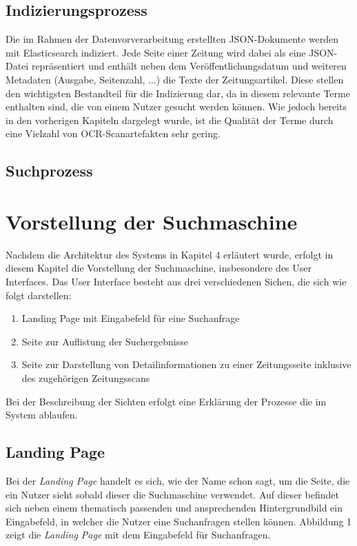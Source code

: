 \documentclass[11pt,a4paper, halfparskip]{scrartcl}
\begin{document}
\subsection{Indizierungsprozess}

Die im Rahmen der Datenvorverarbeitung erstellten JSON-Dokumente werden mit Elasticsearch indiziert. 
Jede Seite einer Zeitung wird dabei als eine JSON-Datei repräsentiert und enthält neben dem Veröffentlichungsdatum und weiteren Metadaten (Ausgabe, Seitenzahl, ...) die Texte der Zeitungsartikel.
Diese stellen den wichtigsten Bestandteil für die Indizierung dar, da in diesem relevante Terme enthalten sind, die von einem Nutzer gesucht werden können.
Wie jedoch bereits in den vorherigen Kapiteln dargelegt wurde, ist die Qualität der Terme durch eine Vielzahl von OCR-Scanartefakten sehr gering.

\subsection{Suchprozess}

\section{Vorstellung der Suchmaschine}

Nachdem die Architektur des Systems in Kapitel 4 erläutert wurde, erfolgt in diesem Kapitel die Vorstellung der Suchmaschine, insbesondere des User Interfaces.
Das User Interface besteht aus drei verschiedenen Sichen, die sich wie folgt darstellen:
	\begin{enumerate}
		\item Landing Page mit Eingabefeld für eine Suchanfrage
		\item Seite zur Auflistung der Suchergebnisse
		\item Seite zur Darstellung von Detailinformationen zu einer Zeitungsseite inklusive des zugehörigen Zeitungsscans  	
	\end{enumerate}
Bei der Beschreibung der Sichten erfolgt eine Erklärung der Prozesse die im System ablaufen.

\subsection{Landing Page}

Bei der \textit{Landing Page} handelt es sich, wie der Name schon sagt, um die Seite, die ein Nutzer sieht sobald dieser die Suchmaschine verwendet.
Auf dieser befindet sich neben einem thematisch passenden und ansprechenden Hintergrundbild ein Eingabefeld, in welcher die Nutzer eine Suchanfragen stellen können. 
Abbildung 1 zeigt die \textit{Landing Page} mit dem Eingabefeld für Suchanfragen.
\end{document}
